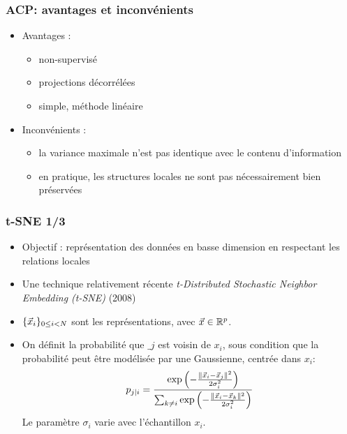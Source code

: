 \begin{frame}
\frametitle{ACP: avantages et inconvénients}
  \begin{itemize}
  	\item Avantages : 
  	\begin{itemize}
  		\item non-supervisé
  		\item projections décorrélées 
  		\item simple, méthode linéaire
  	\end{itemize}
  	\item Inconvénients : 
  	\begin{itemize}
  		\item la variance maximale n'est pas identique avec le contenu d'information
  		\item en pratique, les structures locales ne sont pas nécessairement bien préservées 
  	\end{itemize}
  \end{itemize}
\end{frame}

\begin{frame}
\frametitle{t-SNE 1/3}
\begin{itemize}
	\item Objectif : représentation des données en basse dimension en respectant les relations locales
	\item Une technique relativement récente  \emph{t-Distributed Stochastic Neighbor Embedding (t-SNE)} (2008)
	\item $\{\vec{x}_i\}_{0\leq i < N}$ sont les représentations, avec $\vec{x} \in {\mathbb R}^p$. 
	\item On définit la probabilité que $\_j$ est voisin de $x_i$, sous condition que la probabilité peut être modélisée par une Gaussienne, centrée dans $x_i$:  
	\begin{equation}
	p_{j|i} = \frac{\exp{\left(-\frac{\|\vec{x}_i - \vec{x}_j\|^2}{2 \sigma_i^2}\right)}}{\sum_{k\neq i} \exp{\left(-\frac{\|\vec{x}_i - \vec{x}_k\|^2}{2 \sigma_i^2}\right)} }
	\end{equation}
	Le paramètre $\sigma_i$ varie avec l'échantillon $x_i$. 
\end{itemize}
\end{frame}


